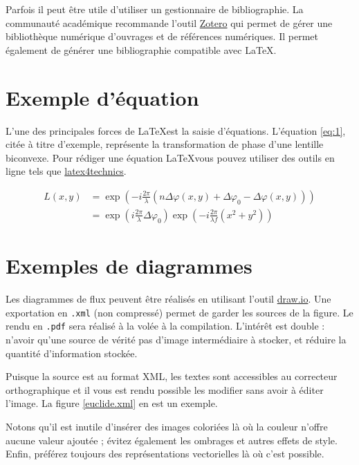 \documentclass[
    iai, %
    eai, %
]{heig-tb}
\begin{document}
Parfois il peut être utile d'utiliser un gestionnaire de bibliographie. La communauté académique recommande l'outil \href{https://www.zotero.org/}{Zotero} qui permet de gérer une bibliothèque numérique d'ouvrages et de références numériques. Il permet également de générer une bibliographie compatible avec \LaTeX.

\section{Exemple d'équation}
L'une des principales forces de \LaTeX est la saisie d'équations. L'équation \ref{eq:1}, citée à titre d'exemple, représente la transformation de phase d'une lentille biconvexe. Pour rédiger une équation \LaTeX vous pouvez utiliser des outils en ligne tels que \href{https://www.latex4technics.com/}{latex4technics}.

\begin{equation} \label{eq:1}
  \begin{split}
    L(x,y) &= \exp\left( - i\frac{{2\pi }}{\lambda }\left( {n\Delta \varphi (x,y) + \Delta {\varphi _0} - \Delta \varphi (x,y)} \right)\right)\\
    &= {\exp\left({i\frac{{2\pi }}{\lambda }\Delta {\varphi _0}}\right)}{\exp\left({ - i\frac{{2\pi }}{{\lambda f}}({x^2} + {y^2})}\right)}
  \end{split}
\end{equation}

\section{Exemples de diagrammes}

Les diagrammes de flux peuvent être réalisés en utilisant l'outil \href{https://app.diagrams.net/}{draw.io}. Une exportation en \texttt{.xml} (non compressé) permet de garder les sources de la figure. Le rendu en \texttt{.pdf} sera réalisé à la volée à la compilation. L'intérêt est double : n'avoir qu'une source de vérité \cad pas d'image intermédiaire à stocker, et réduire la quantité d'information stockée.

Puisque la source est au format XML, les textes sont accessibles au correcteur orthographique et il vous est rendu possible les modifier sans avoir à éditer l'image. La figure \ref{euclide.xml} en est un exemple.



Notons qu'il est inutile d'insérer des images coloriées là où la couleur n'offre aucune valeur ajoutée ; évitez également les ombrages et autres effets de style. Enfin, préférez toujours des représentations vectorielles là où c'est possible.
\end{document}
